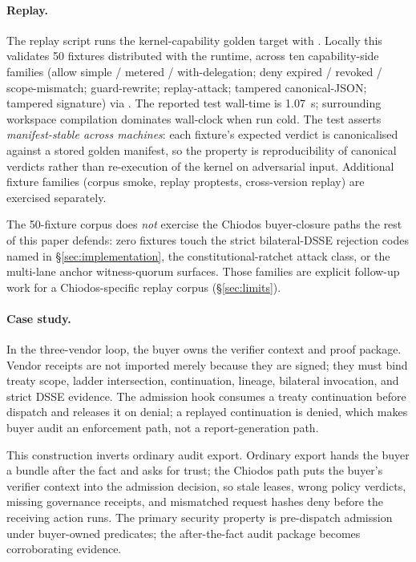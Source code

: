 \paragraph{Replay.}
The replay script runs the kernel-capability golden target with . Locally this validates 50 fixtures distributed with the runtime, across ten capability-side families (allow simple / metered / with-delegation; deny expired / revoked / scope-mismatch; guard-rewrite; replay-attack; tampered canonical-JSON; tampered signature) via . The reported test wall-time is 1.07~s; surrounding workspace compilation dominates wall-clock when run cold. The test asserts \emph{manifest-stable across machines}: each fixture's expected verdict is canonicalised against a stored golden manifest, so the property is reproducibility of canonical verdicts rather than re-execution of the kernel on adversarial input. Additional fixture families (corpus smoke, replay proptests, cross-version replay) are exercised separately.

The 50-fixture corpus does \emph{not} exercise the Chiodos buyer-closure paths the rest of this paper defends: zero fixtures touch the strict bilateral-DSSE rejection codes named in \S\ref{sec:implementation}, the constitutional-ratchet attack class, or the multi-lane anchor witness-quorum surfaces. Those families are explicit follow-up work for a Chiodos-specific replay corpus (\S\ref{sec:limits}).

\paragraph{Case study.}
In the three-vendor loop, the buyer owns the verifier context and proof package. Vendor receipts are not imported merely because they are signed; they must bind treaty scope, ladder intersection, continuation, lineage, bilateral invocation, and strict DSSE evidence. The admission hook consumes a treaty continuation before dispatch and releases it on denial; a replayed continuation is denied, which makes buyer audit an enforcement path, not a report-generation path.

This construction inverts ordinary audit export. Ordinary export hands the buyer a bundle after the fact and asks for trust; the Chiodos path puts the buyer's verifier context into the admission decision, so stale leases, wrong policy verdicts, missing governance receipts, and mismatched request hashes deny before the receiving action runs. The primary security property is pre-dispatch admission under buyer-owned predicates; the after-the-fact audit package becomes corroborating evidence.

